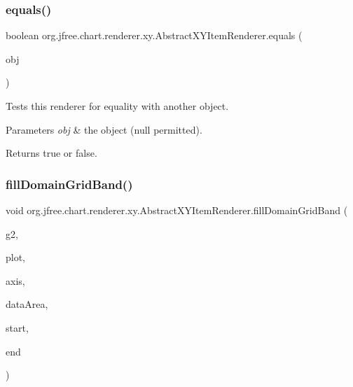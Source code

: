 \subsubsection{\texorpdfstring{equals()}{equals()}}
{\footnotesize\ttfamily boolean org.\+jfree.\+chart.\+renderer.\+xy.\+Abstract\+X\+Y\+Item\+Renderer.\+equals (\begin{DoxyParamCaption}\item[{Object}]{obj }\end{DoxyParamCaption})}

Tests this renderer for equality with another object.


\begin{DoxyParams}{Parameters}
{\em obj} & the object ({\ttfamily null} permitted).\\
\hline
\end{DoxyParams}
\begin{DoxyReturn}{Returns}
{\ttfamily true} or {\ttfamily false}. 
\end{DoxyReturn}
\mbox{\label{classorg_1_1jfree_1_1chart_1_1renderer_1_1xy_1_1_abstract_x_y_item_renderer_a6251d146130d6c18f5478825e587d715}} 
\subsubsection{\texorpdfstring{fill\+Domain\+Grid\+Band()}{fillDomainGridBand()}}
{\footnotesize\ttfamily void org.\+jfree.\+chart.\+renderer.\+xy.\+Abstract\+X\+Y\+Item\+Renderer.\+fill\+Domain\+Grid\+Band (\begin{DoxyParamCaption}\item[{Graphics2D}]{g2,  }\item[{\mbox{\hyperlink{classorg_1_1jfree_1_1chart_1_1plot_1_1_x_y_plot}{X\+Y\+Plot}}}]{plot,  }\item[{\mbox{\hyperlink{classorg_1_1jfree_1_1chart_1_1axis_1_1_value_axis}{Value\+Axis}}}]{axis,  }\item[{Rectangle2D}]{data\+Area,  }\item[{double}]{start,  }\item[{double}]{end }\end{DoxyParamCaption})}

